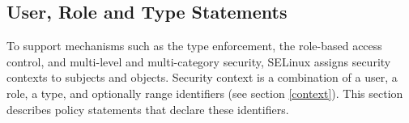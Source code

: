 
\subsection{User, Role and Type Statements}
\label{userroletype}
To support mechanisms such as the type enforcement, the role-based access
control, and multi-level and multi-category security, SELinux assigns security
contexts to subjects and objects. Security context is a combination of a user, a
role, a type, and optionally range identifiers (see section \ref{context}). This
section describes policy statements that declare these identifiers.

